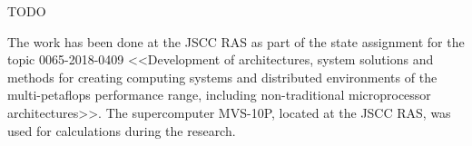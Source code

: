 \documentclass[
11pt,%
tightenlines,%
twoside,%
onecolumn,%
nofloats,%
nobibnotes,%
nofootinbib,%
superscriptaddress,%
noshowpacs,%
centertags]%
{revtex4}
\begin{document}
TODO

\begin{acknowledgments}
The work has been done at the JSCC RAS as part of the state assignment for the topic 0065-2018-0409 <<Development of architectures, system solutions and methods for creating computing systems and distributed environments of the multi-petaflops performance range, including non-traditional microprocessor architectures>>. The supercomputer MVS-10P, located at the JSCC RAS, was used for calculations during the research.
\end{acknowledgments}

\begin{thebibliography}{99}


\end{thebibliography}
\end{document}
